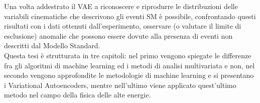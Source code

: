 Una volta addestrato il VAE a riconoscere e riprodurre le distribuzioni delle variabili cinematiche che descrivono gli eventi SM è possibile, confrontando questi risultati con i dati ottenuti dall'esperimento, osservare (o valutare il limite di esclusione) anomalie che possono essere dovute alla presenza di eventi non descritti dal Modello Standard.\\
Questa tesi è strutturata in tre capitoli: nel primo vengono spiegate le differenze fra gli algoritmi di machine learning ed i metodi di analisi multivariata e non, nel secondo vengono approfondite le metodologie di machine learning e si presentano i Variational Autoencoders, mentre nell'ultimo viene applicato quest'ultimo metodo nel campo della fisica delle alte energie.


\newpage






	


